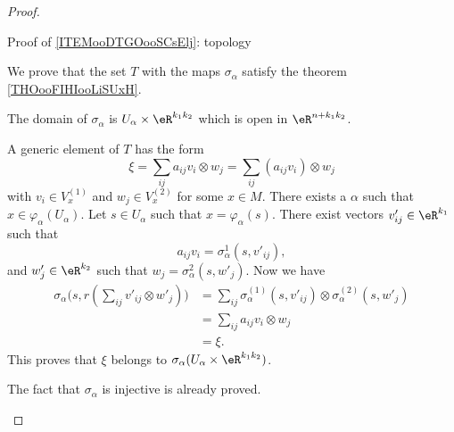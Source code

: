 \begin{proof}
	\begin{proofpart}
		Proof of \ref{ITEMooDTGOooSCsElj}: topology
	\end{proofpart}

	We prove that the set \( T\) with the maps \( \sigma_{\alpha}\) satisfy the theorem \ref{THOooFIHIooLiSUxH}.
	\begin{subproof}
		The domain of \( \sigma_{\alpha}\) is \( U_{\alpha}\times \eR^{k_1k_2}\) which is open in \( \eR^{n+k_1k_2}\).

		A generic element of \( T\) has the form
		\begin{equation}
			\xi=\sum_{ij}a_{ij} v_i\otimes w_j=\sum_{ij} (a_{ij}v_i)\otimes w_j
		\end{equation}
		with \( v_i\in V_x^{(1)}\) and \( w_j\in V_x^{(2)}\) for some \( x\in M\). There exists a \( \alpha\) such that \( x\in \varphi_{\alpha}(U_{\alpha})\). Let \( s\in U_{\alpha}\) such that \( x=\varphi_{\alpha}(s)\). There exist vectors \( v'_{ij}\in \eR^{k_1}\) such that
		\begin{equation}
			a_{ij}v_i=\sigma_{\alpha}^{1}(s,v'_{ij}),
		\end{equation}
		and \( w'_j\in \eR^{k_2}\) such that \( w_j=\sigma_{\alpha}^{2}(s,w'_j)\). Now we have
		\begin{subequations}
			\begin{align}
				\sigma_{\alpha}\big( s,r(\sum_{ij}v'_{ij}\otimes w'_j) \big) & =\sum_{ij}\sigma_{\alpha}^{(1)}(s,v'_{ij})\otimes \sigma_{\alpha}^{(2)}(s,w'_j) \\
				                                                             & = \sum_{ij}a_{ij}v_i\otimes w_j                                                 \\
				                                                             & =\xi.
			\end{align}
		\end{subequations}
		This proves that \( \xi\) belongs to \( \sigma_{\alpha}(U_{\alpha}\times \eR^{k_1k_2})\).

		The fact that \( \sigma_{\alpha}\) is injective is already proved.


\end{subproof}
\end{proof}

